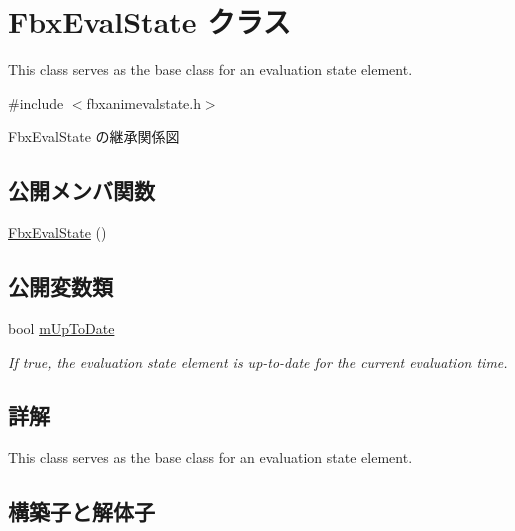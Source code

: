 \hypertarget{class_fbx_eval_state}{}\section{Fbx\+Eval\+State クラス}
\label{class_fbx_eval_state}


This class serves as the base class for an evaluation state element.  




{\ttfamily \#include $<$fbxanimevalstate.\+h$>$}



Fbx\+Eval\+State の継承関係図
\subsection*{公開メンバ関数}
\begin{DoxyCompactItemize}
\item 
\hyperlink{class_fbx_eval_state_a9c54619a6fa810228fbb017965492507}{Fbx\+Eval\+State} ()
\end{DoxyCompactItemize}
\subsection*{公開変数類}
\begin{DoxyCompactItemize}
\item 
bool \hyperlink{class_fbx_eval_state_a9c153054cba876e54d38046e582b32d0}{m\+Up\+To\+Date}
\begin{DoxyCompactList}\small\item\em If {\ttfamily true}, the evaluation state element is up-\/to-\/date for the current evaluation time. \end{DoxyCompactList}\end{DoxyCompactItemize}


\subsection{詳解}
This class serves as the base class for an evaluation state element. 

\subsection{構築子と解体子}
\mbox{\label{class_fbx_eval_state_a9c54619a6fa810228fbb017965492507}} 
